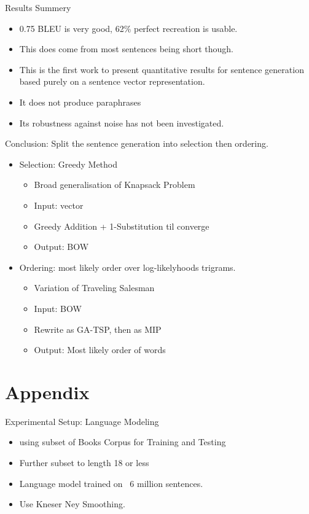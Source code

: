 \documentclass[]{beamer}
\begin{document}
\begin{frame}{Results Summery}
	\begin{itemize}
		\item 0.75 BLEU is very good, 62\% perfect recreation is usable.
		\item This does come from most sentences being short though.
		\item This is the first work to present quantitative results for sentence generation based purely on a sentence vector representation.
		\item It does not produce paraphrases
		\item Its robustness against noise has not been investigated.
	\end{itemize}
\end{frame}



\begin{frame}{Conclusion: Split the sentence generation into selection then ordering.}
	\begin{itemize}
		\item<1->Selection: Greedy Method
		\begin{itemize}
			\item Broad generalisation of Knapsack Problem
			\item Input: vector
			\item Greedy Addition + 1-Substitution til converge
			\item Output: BOW
		\end{itemize}
		\vfill
		\item<2->Ordering: most likely order over log-likelyhoods trigrams.
		\begin{itemize}
			\item Variation of Traveling Salesman
			\item Input: BOW
			\item Rewrite as GA-TSP, then as MIP
			\item Output: Most likely order of words
		\end{itemize}
	\end{itemize}
\end{frame}

\section{Appendix}

\begin{frame}{Experimental Setup: Language Modeling}
	\begin{itemize}
		\item using subset of Books Corpus for Training and Testing
		\item<1-> Further subset to length 18 or less
		\vfill
		\item<2-> Language model trained on ~6 million sentences.
		\item<2-> Use Kneser Ney Smoothing. 
		
	\end{itemize}
\end{frame}
\end{document}

